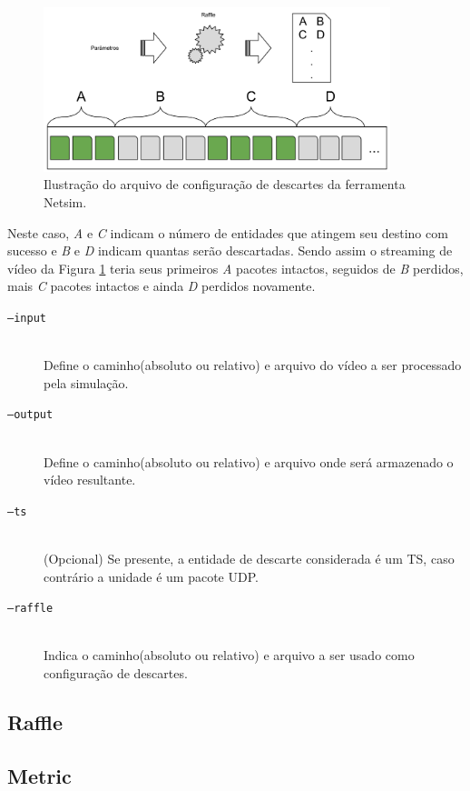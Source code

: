 \begin{figure}[!htb]
	\centering
	\includegraphics[width=0.9\textwidth]{./imgs/netsim.png}
	\caption{Ilustração do arquivo de configuração de descartes da ferramenta Netsim.}
	\label{fig:netsim}
\end{figure}

Neste caso, \emph{A} e \emph{C} indicam o número de entidades que atingem seu destino com sucesso e \emph{B} e \emph{D} indicam quantas serão descartadas. 
Sendo assim o streaming de vídeo da Figura \ref{fig:netsim}  teria seus primeiros \emph{A} pacotes intactos, seguidos de \emph{B} perdidos, mais \emph{C} pacotes intactos e ainda \emph{D} perdidos novamente.

\begin{description}
	\item[\texttt{--input}] \hfill \\
		Define o caminho(absoluto ou relativo) e arquivo do vídeo a ser processado pela simulação.
	\item[\texttt{--output}] \hfill \\
		Define o caminho(absoluto ou relativo) e arquivo onde será armazenado o vídeo resultante.
	\item[\texttt{--ts}] \hfill \\
		(Opcional) Se presente, a entidade de descarte considerada é um TS, caso contrário a unidade é um pacote UDP.
	\item[\texttt{--raffle}] \hfill \\
		Indica o caminho(absoluto ou relativo) e arquivo a ser usado como configuração de descartes.
\end{description}

\subsection{Raffle}
\subsection{Metric}

